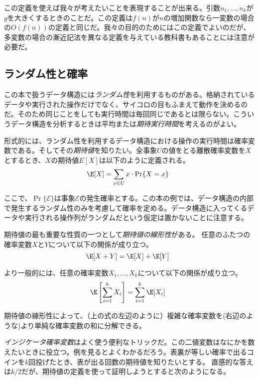 この定義を使えば我々が考えたいことを表現することが出来る。引数$n_1,\ldots,n_k$が$g$を大きくするときのことだ。この定義は$f(n)$が$n$の増加関数なら一変数の場合の$O(f(n))$の定義と同じだ。我々の目的のためにはこの定義でよいのだが、多変数の場合の漸近記法を異なる定義を与えている教科書もあることには注意が必要だ。

\subsection{ランダム性と確率}

%
%
%
%
この本で扱うデータ構造には\emph{ランダム性}を利用するものがある。格納されているデータや実行された操作だけでなく、サイコロの目もふまえて動作を決めるのだ。そのため同じことをしても実行時間は毎回同じであるとは限らない。こういうデータ構造を分析するときは平均または\emph{期待実行時間}を考えるのがよい。
%
%

形式的には、ランダム性を利用するデータ構造における操作の実行時間は確率変数である。そしてその\emph{期待値}を知りたい。全事象$U$の値をとる離散確率変数を$X$とするとき、$X$の期待値$E[X]$は以下のように定義される。
%
\[
    \E[X] = \sum_{x\in U} x\cdot\Pr\{X=x\} \enspace
\]

ここで、$\Pr\{\mathcal{E}\}$は事象$\mathcal{E}$の発生確率とする。この本の例では、データ構造の内部で発生するランダム性のみを考慮して確率を定める。データ構造に入ってくるデータや実行される操作列がランダムだという仮定は置かないことに注意する。

期待値の最も重要な性質の一つとして\emph{期待値の線形性}がある。
%
任意のふたつの確率変数$X$と$Y$について以下の関係が成り立つ。
\[
   \E[X+Y] = \E[X] + \E[Y] \enspace
\]

より一般的には、任意の確率変数$ X_1,\ldots,X_k $について以下の関係が成り立つ。
\[
   \E\left[\sum_{i=1}^k X_i\right] = \sum_{i=1}^k \E[X_i] \enspace
\]

期待値の線形性によって、（上の式の左辺のように）複雑な確率変数を(右辺のような)より単純な確率変数の和に分解できる。

\emph{インジケータ確率変数}はよく使う便利なトリックだ。この二値変数はなにかを数えたいときに役立つ。例を見るとよくわかるだろう。表裏が等しい確率で出るコインを$k$回投げたとき、表が出る回数の期待値を知りたいとする。
直感的な答えは$k/2$だが、期待値の定義を使って証明しようとすると次のようになる。

